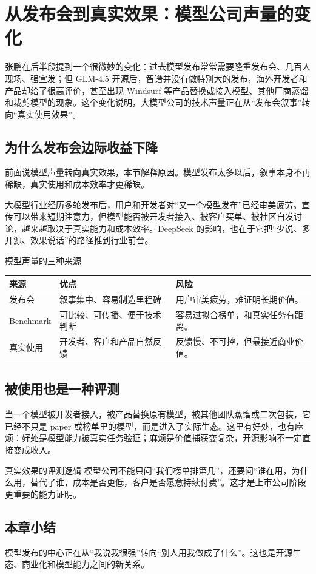 \section{从发布会到真实效果：模型公司声量的变化}

张鹏在后半段提到一个很微妙的变化：过去模型发布常常需要隆重发布会、几百人现场、强宣发；但 GLM-4.5 开源后，智谱并没有做特别大的发布，海外开发者和产品却给了很高评价，甚至出现 Windsurf 等产品替换或接入模型、其他厂商蒸馏和裁剪模型的现象。这个变化说明，大模型公司的技术声量正在从“发布会叙事”转向“真实使用效果”。

\subsection{为什么发布会边际收益下降}

前面说模型声量转向真实效果，本节解释原因。模型发布太多以后，叙事本身不再稀缺，真实使用和成本效率才更稀缺。

大模型行业经历多轮发布后，用户和开发者对“又一个模型发布”已经审美疲劳。宣传可以带来短期注意力，但模型能否被开发者接入、被客户买单、被社区自发讨论，越来越取决于真实能力和成本效率。DeepSeek 的影响，也在于它把“少说、多开源、效果说话”的路径推到行业前台。

\begin{knowledgebox}{模型声量的三种来源}
\begin{tabularx}{\textwidth}{p{}p{}X}
\toprule
来源 & 优点 & 风险 \\
\midrule
发布会 & 叙事集中、容易制造里程碑 & 用户审美疲劳，难证明长期价值。 \\
Benchmark & 可比较、可传播、便于技术判断 & 容易过拟合榜单，和真实任务有距离。 \\
真实使用 & 开发者、客户和产品自然反馈 & 反馈慢、不可控，但最接近商业价值。 \\
\bottomrule
\end{tabularx}
\end{knowledgebox}

\subsection{被使用也是一种评测}

当一个模型被开发者接入，被产品替换原有模型，被其他团队蒸馏或二次包装，它已经不只是 paper 或榜单里的模型，而是进入了实际生态。这里有好处，也有麻烦：好处是模型能力被真实任务验证；麻烦是价值捕获变复杂，开源影响不一定直接变成收入。

\begin{importantbox}{真实效果的评测逻辑}
模型公司不能只问“我们榜单排第几”，还要问“谁在用，为什么用，替代了谁，成本是否更低，客户是否愿意持续付费”。这才是上市公司阶段更重要的能力证明。
\end{importantbox}

\subsection{本章小结}

模型发布的中心正在从“我说我很强”转向“别人用我做成了什么”。这也是开源生态、商业化和模型能力之间的新关系。

